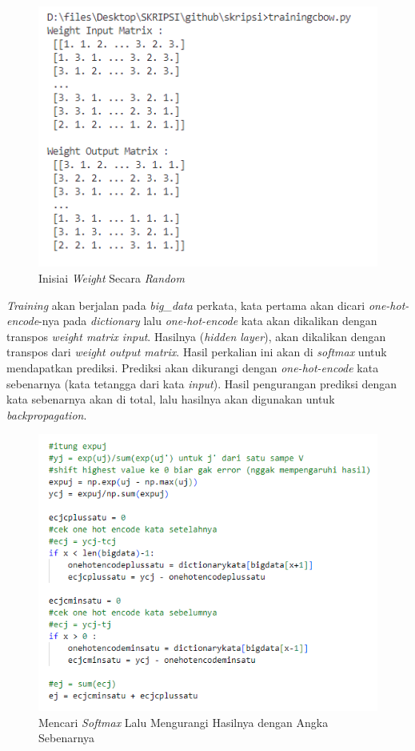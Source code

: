 \documentclass[12pt]{report}
\begin{document}
\begin{figure}[H]
\centering
\includegraphics[scale=0.75]{inisiasi_weight}
\caption{Inisiai \textit{Weight} Secara \textit{Random}}
\label{inisiasiweight}
\end{figure}

\textit{Training} akan berjalan pada \textit{big\_data} perkata, kata pertama akan dicari \textit{one-hot-encode}-nya pada \textit{dictionary} lalu \textit{one-hot-encode} kata akan dikalikan dengan transpos \textit{weight matrix input}. Hasilnya (\textit{hidden layer}), akan dikalikan dengan transpos dari \textit{weight output matrix}. Hasil perkalian ini akan di \textit{softmax} untuk mendapatkan prediksi. Prediksi akan dikurangi dengan \textit{one-hot-encode} kata sebenarnya (kata tetangga dari kata \textit{input}). Hasil pengurangan prediksi dengan kata sebenarnya akan di total, lalu hasilnya akan digunakan untuk \textit{backpropagation}. 


\begin{figure}[H]
\centering
\includegraphics[scale=0.75]{softmaxlaluerror}
\caption{Mencari \textit{Softmax} Lalu Mengurangi Hasilnya dengan Angka Sebenarnya}
\label{softmaxlaluerror}
\end{figure}
\end{document}
